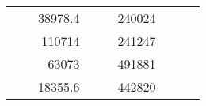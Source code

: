 \begin{table}[H]
\begin{tabular}{|ccrccrccc}
\multicolumn{1}{|c|}{\cellcolor[HTML]{FFFFC7}}                                & \multicolumn{1}{c|}{\cellcolor[HTML]{DAE8FC}}                      & \multicolumn{1}{r|}{\cellcolor[HTML]{DAE8FC}38978.4}   & \multicolumn{1}{c|}{\cellcolor[HTML]{FFFFC7}}                                & \multicolumn{1}{c|}{\cellcolor[HTML]{DAE8FC}}                       & \multicolumn{1}{r|}{\cellcolor[HTML]{DDFDFF}240024}    &                                                                              &                                                                    &                                                        \\ \cline{3-3} \cline{6-6}
\multicolumn{1}{|c|}{\cellcolor[HTML]{FFFFC7}}                                & \multicolumn{1}{c|}{\cellcolor[HTML]{DAE8FC}}                      & \multicolumn{1}{r|}{\cellcolor[HTML]{DDFDFF}110714}    & \multicolumn{1}{c|}{\cellcolor[HTML]{FFFFC7}}                                & \multicolumn{1}{c|}{\cellcolor[HTML]{DAE8FC}}                       & \multicolumn{1}{r|}{\cellcolor[HTML]{DAE8FC}241247}    &                                                                              &                                                                    &                                                        \\ \cline{3-3} \cline{6-6}
\multicolumn{1}{|c|}{\cellcolor[HTML]{FFFFC7}}                                & \multicolumn{1}{c|}{\cellcolor[HTML]{DAE8FC}}                      & \multicolumn{1}{r|}{\cellcolor[HTML]{DAE8FC}63073}     & \multicolumn{1}{c|}{\cellcolor[HTML]{FFFFC7}}                                & \multicolumn{1}{c|}{\cellcolor[HTML]{DAE8FC}}                       & \multicolumn{1}{r|}{\cellcolor[HTML]{DDFDFF}491881}    &                                                                              &                                                                    &                                                        \\ \cline{3-3} \cline{6-6}
\multicolumn{1}{|c|}{\cellcolor[HTML]{FFFFC7}}                                & \multicolumn{1}{c|}{\cellcolor[HTML]{DAE8FC}}                      & \multicolumn{1}{r|}{\cellcolor[HTML]{DDFDFF}18355.6}   & \multicolumn{1}{c|}{\cellcolor[HTML]{FFFFC7}}                                & \multicolumn{1}{c|}{\cellcolor[HTML]{DAE8FC}}                       & \multicolumn{1}{r|}{\cellcolor[HTML]{DAE8FC}442820}    &                                                                              &                                                                    &                                                        \\ \cline{3-3} \cline{6-6}

\end{tabular}
\end{table}
